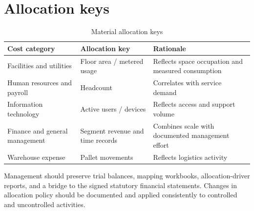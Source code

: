 \section{Allocation keys}
\begin{table}[htbp]
  \centering
  \caption{Material allocation keys}
  \label{tab:allocations}
  \begin{tabularx}{\textwidth}{@{}P{38mm}P{35mm}Y@{}}
    \toprule
    \textbf{Cost category} & \textbf{Allocation key} & \textbf{Rationale}\\
    \midrule
    Facilities and utilities & Floor area / metered usage & Reflects space occupation and measured consumption\\
    Human resources and payroll & Headcount & Correlates with service demand\\
    Information technology & Active users / devices & Reflects access and support volume\\
    Finance and general management & Segment revenue and time records & Combines scale with documented management effort\\
    Warehouse expense & Pallet movements & Reflects logistics activity\\
    \bottomrule
  \end{tabularx}
\end{table}

Management should preserve trial balances, mapping workbooks, allocation-driver
reports, and a bridge to the signed statutory financial statements. Changes in
allocation policy should be documented and applied consistently to controlled
and uncontrolled activities.

